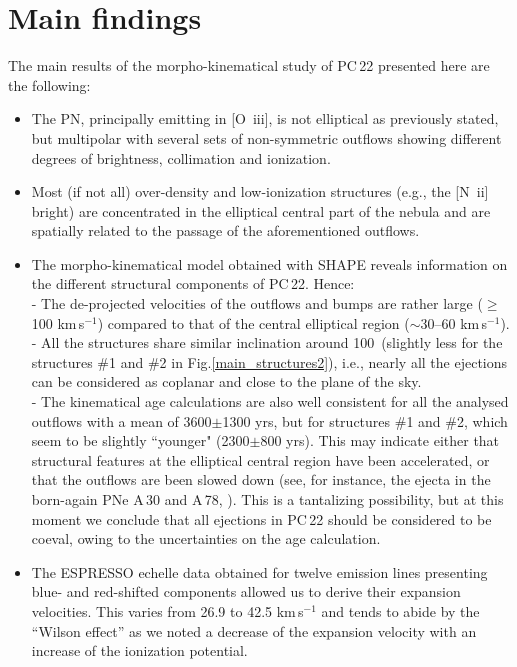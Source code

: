 \documentclass[fleqn,usenatbib,useAMS]{mnras}
\begin{document}
\section{Main findings}\label{sec_find}

The main results of the morpho-kinematical study of PC\,22 presented here
are the following:\\
\begin{itemize}
\item
The PN, principally emitting in {[O~{\sc iii}]}, is not elliptical as
previously stated, but multipolar with several sets of non-symmetric
outflows showing different degrees of brightness, collimation and ionization.
\item
Most (if not all) over-density and low-ionization structures (e.g., the
[N~{\sc ii}] bright) are concentrated in the elliptical central part of
the nebula and are spatially related to the passage of the aforementioned
outflows.
\item
The morpho-kinematical model obtained with {\sc SHAPE} reveals information
on the different structural components of PC\,22.
Hence: \\
- The de-projected velocities of the outflows and bumps are rather large
($\geq$ 100 km\,s$^{-1}$) compared to that of the central elliptical
region ($\sim$30--60 km\,s$^{-1}$). \\
- All the structures share similar inclination around 100\degr\ (slightly
less for the structures \#1 and \#2 in Fig.\ref{main_structures2}), i.e.,
nearly all the ejections can be considered as coplanar and close to the
plane of the sky. \\
- The kinematical age calculations are also well consistent for all the
analysed outflows with a mean of 3600$\pm$1300 yrs, but for structures
\#1 and \#2, which seem to be slightly ``younger" (2300$\pm$800 yrs).
This may indicate either that structural features at the elliptical
central region have been accelerated, or that the outflows are been
slowed down (see, for instance, the ejecta in the born-again PNe
A\,30 and A\,78, \citealt{Fang2014}).
This is a tantalizing possibility, but at this moment we conclude that
all ejections in PC\,22 should be considered to be coeval, owing to the
uncertainties on the age calculation.
\item
The ESPRESSO echelle data obtained for twelve emission lines presenting
blue- and red-shifted components allowed us to derive their expansion
velocities.
This varies from 26.9 to 42.5 km\,s$^{-1}$ and tends to abide by the
``Wilson effect'' as we noted a decrease of the expansion velocity
with an increase of the ionization potential.
\end{itemize}
\end{document}
